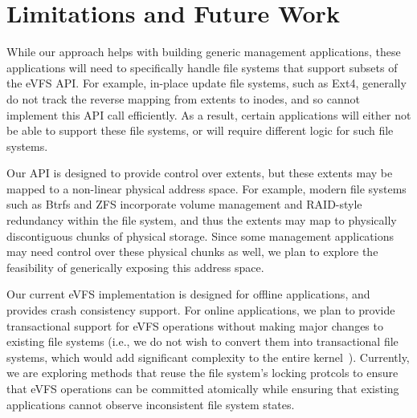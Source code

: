 \vspace{-0.7em}
\section{Limitations and Future Work\label{sec:Future_Work}}
\vspace{-0.4em}

While our approach helps with building generic management applications, these applications will need to specifically handle file systems that support subsets of the eVFS API. For example, in-place update file systems, such as Ext4, generally do not track the reverse mapping from extents to inodes, and so cannot implement this API call efficiently. As a result, certain applications will either not be able to support these file systems, or will require different logic for such file systems.


Our API is designed to provide control over extents, but these extents may be mapped to a non-linear physical address space. For example, modern file systems such as Btrfs and ZFS incorporate volume management and RAID-style redundancy within the file system, and thus the extents may map to physically discontiguous chunks of physical storage. Since some management applications may need control over these physical chunks as well, we plan to explore the feasibility of generically exposing this address space.


Our current eVFS implementation is designed for offline applications, and provides crash consistency support. For online applications, we plan to provide transactional support for eVFS operations without making major changes to existing file systems (i.e., we do not wish to convert them into transactional file systems, which would add significant complexity to the entire kernel~\cite{Spillane2009}). Currently, we are exploring methods that reuse the file system's locking protcols to ensure that eVFS operations can be committed atomically while ensuring that existing applications cannot observe inconsistent file system states.

